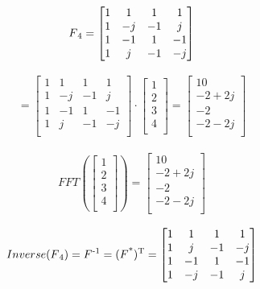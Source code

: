 \documentclass[a4paper]{article}
\begin{document}
\begin{align}
F\textsubscript{4} =
\begin{bmatrix}
	1 & 1 & 1 & 1\\
	1 & -j & -1 & j\\
	1 & -1 & 1 & -1\\
	1 & j & -1 & -j\\
 \end{bmatrix}
\end{align}

\begin{align}
=
\begin{bmatrix}
	1 & 1 & 1 & 1\\
	1 & -j & -1 & j\\
	1 & -1 & 1 & -1\\
	1 & j & -1 & -j\\
 \end{bmatrix}
 \cdot
 \begin{bmatrix}
	1\\
	2\\
	3\\
	4\\
 \end{bmatrix}
 =
 \begin{bmatrix}
	10\\
	-2 + 2j\\
	-2\\
	-2 - 2j\\
 \end{bmatrix}
\end{align}

\begin{align}
FFT (
 \begin{bmatrix}
	1\\
	2\\
	3\\
	4\\
 \end{bmatrix}
 ) =
 \begin{bmatrix}
	10\\
	-2 + 2j\\
	-2\\
	-2 - 2j\\
 \end{bmatrix}
 \end{align}
 
 
\begin{align}
Inverse(F\textsubscript{4}) = F\textsuperscript{-1} = (F\textsuperscript{*})\textsuperscript{T} = 
\begin{bmatrix}
	1 & 1 & 1 & 1\\
	1 & j & -1 & -j\\
	1 & -1 & 1 & -1\\
	1 & -j & -1 & j\\
 \end{bmatrix}
\end{align}
\end{document}

